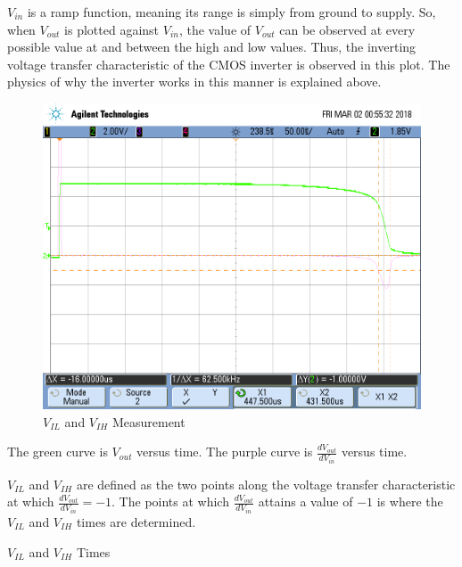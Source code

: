 $V_{in}$ is a ramp function, meaning its range is simply from ground to supply.
So, when $V_{out}$ is plotted against $V_{in}$, the value of $V_{out}$ can be observed at every possible value at and between the high and low values.
Thus, the inverting voltage transfer characteristic of the CMOS inverter is observed in this plot.
The physics of why the inverter works in this manner is explained above.

\FloatBarrier

\begin{figure}[h!]
	\centering
	\includegraphics[scale=0.75]{../images/vil_vih_measure.PNG}
	\caption{$V_{IL}$ and $V_{IH}$ Measurement}
	\label{fig:vil_vih_measure}
\end{figure}

\FloatBarrier

{\footnotesize The green curve is $V_{out}$ versus time. The purple curve is $\frac{dV_{out}}{dV_{in}}$ versus time.}

\FloatBarrier

$V_{IL}$ and $V_{IH}$ are defined as the two points along the voltage transfer characteristic at which $\frac{dV_{out}}{dV_{in}} = -1$.
The points at which $\frac{dV_{out}}{dV_{in}}$ attains a value of $-1$ is where the $V_{IL}$ and $V_{IH}$ times are determined.

\FloatBarrier

\begin{table}[h!]
	\centering
	\caption{$V_{IL}$ and $V_{IH}$ Times}
	\label{tab:vil_vih_measure}
\end{table}

